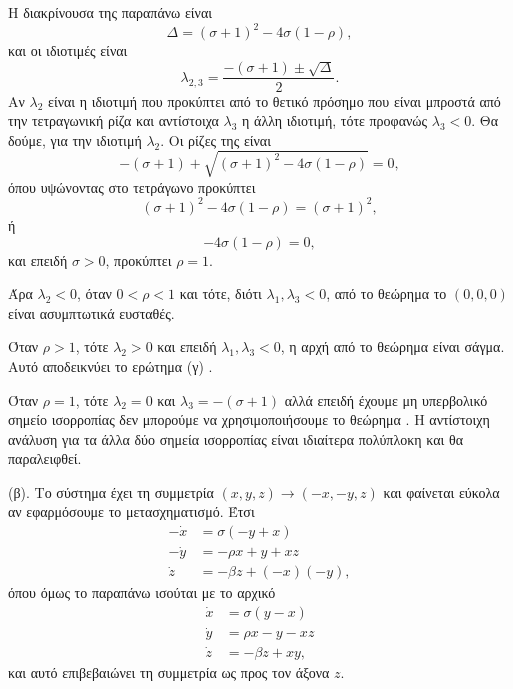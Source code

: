\begin{solution}
\begin{equation*}
    \end{equation*}
    Η διακρίνουσα της παραπάνω είναι
    \begin{equation*}
        \Delta = {(\sigma + 1)}^2 - 4\sigma(1 - \rho),
    \end{equation*}
    και οι ιδιοτιμές είναι
    \begin{equation*}
        \lambda_{2,3} = \frac{-(\sigma + 1) \pm \sqrt{\Delta}}{2}.
    \end{equation*}
    Αν \( \lambda_2 \) είναι η ιδιοτιμή που προκύπτει από το θετικό
    πρόσημο που είναι μπροστά από την τετραγωνική ρίζα και αντίστοιχα
    \( \lambda_3 \) η άλλη ιδιοτιμή, τότε προφανώς  \( \lambda_3 < 0 \). Θα
    δούμε, για την ιδιοτιμή \( \lambda_2 \). Οι ρίζες της είναι
    \begin{equation*}
        -(\sigma + 1) + \sqrt{{(\sigma + 1)}^2 - 4\sigma(1 - \rho)} = 0,
    \end{equation*}
    όπου υψώνοντας στο τετράγωνο προκύπτει
    \begin{equation*}
        {(\sigma + 1)}^2 - 4\sigma(1 - \rho) = {(\sigma + 1)}^2,
    \end{equation*}
    ή
    \begin{equation*}
        - 4\sigma(1 - \rho) = 0,
    \end{equation*}
    και επειδή \( \sigma > 0 \), προκύπτει \( \rho = 1 \).

    Άρα \( \lambda_2 < 0 \), όταν \( 0 < \rho < 1 \) και τότε, διότι
    \( \lambda_1, \lambda_3 < 0 \), από το θεώρημα
     το \( (0, 0, 0) \) είναι ασυμπτωτικά ευσταθές.

    Όταν \( \rho > 1 \), τότε \( \lambda_2 > 0 \) και επειδή
    \( \lambda_1, \lambda_3 < 0 \), η αρχή από το θεώρημα
     είναι σάγμα. Αυτό αποδεικνύει το ερώτημα (γ)
    .

    Όταν \( \rho = 1 \), τότε \( \lambda_2 = 0 \) και \( \lambda_3 = -(\sigma +
    1) \) αλλά επειδή έχουμε μη υπερβολικό σημείο ισορροπίας δεν μπορούμε να
    χρησιμοποιήσουμε το θεώρημα . Η αντίστοιχη ανάλυση για
    τα άλλα δύο σημεία ισορροπίας είναι ιδιαίτερα πολύπλοκη και θα παραλειφθεί.

    (β). Το σύστημα έχει τη συμμετρία \( (x, y, z) \to (-x, -y, z) \) και
    φαίνεται εύκολα αν εφαρμόσουμε το μετασχηματισμό. Έτσι
    \begin{align*}
        -\dot{x} &= \sigma(-y + x) \\
        -\dot{y} &= -\rho x + y + xz \\
        \dot{z} &= -\beta z + (-x)(-y),
    \end{align*}
    όπου όμως το παραπάνω ισούται με το αρχικό
    \begin{align*}
        \dot{x} &= \sigma(y - x) \\
        \dot{y} &= \rho x - y - xz \\
        \dot{z} &= -\beta z + xy,
    \end{align*}
    και αυτό επιβεβαιώνει τη συμμετρία ως προς τον άξονα \( z \).


\end{solution}
